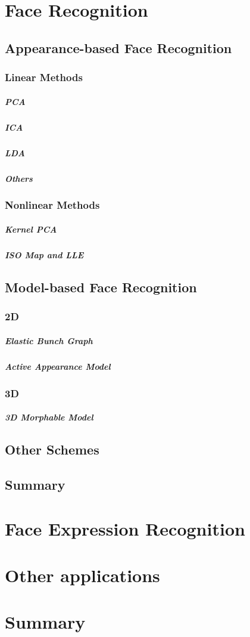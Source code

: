 \section{Face Recognition}
\subsection{Appearance-based Face Recognition}
\subsubsection{Linear Methods}
\subparagraph{PCA}
\subparagraph{ICA}
\subparagraph{LDA}
\subparagraph{Others}
\subsubsection{Nonlinear Methods}
\subparagraph{Kernel PCA}
\subparagraph{ISO Map and LLE}
\subsection{Model-based Face Recognition}
\subsubsection{2D}
\subparagraph{Elastic Bunch Graph}
\subparagraph{Active Appearance Model}
\subsubsection{3D}
\subparagraph{3D Morphable Model}
\subsection{Other Schemes}
\subsection{Summary}
\section{Face Expression Recognition}
\section{Other applications}
\section{Summary}
